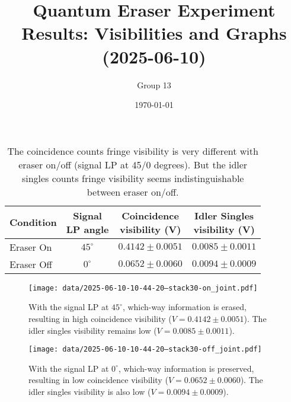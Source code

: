 \documentclass{article}
\title{Quantum Eraser Experiment Results: Visibilities and Graphs (2025-06-10)}
\author{Group 13} %
\date{\today}
\begin{document}
\pagestyle{empty} %

\begin{table}[h!]
\centering
\begin{tabular}{lccc}
\toprule
Condition & \makecell{Signal \\ LP angle} & \makecell{Coincidence \\ visibility (V)} & \makecell{Idler Singles \\ visibility (V)} \\
\midrule
Eraser On   & $45^\circ$ & $0.4142 \pm 0.0051$ & $0.0085 \pm 0.0011$ \\
Eraser Off  & $0^\circ$  & $0.0652 \pm 0.0060$ & $0.0094 \pm 0.0009$ \\
\bottomrule
\end{tabular}
\caption*{
  The coincidence counts fringe visibility is very different with eraser on/off (signal LP at 45/0 degrees).
  But the idler singles counts fringe visibility seems indistinguishable between eraser on/off.
}
\end{table}

\begin{figure}[h!]
\centering
\texttt{[image: data/2025-06-10-10-44-20--stack30-on\_joint.pdf]}
\caption*{
  With the signal LP at $45^\circ$, which-way information is erased, resulting in high coincidence visibility ($V=0.4142 \pm 0.0051$). The idler singles visibility remains low ($V=0.0085 \pm 0.0011$).
}
\end{figure}

\begin{figure}[h!]
\centering
\texttt{[image: data/2025-06-10-10-44-20--stack30-off\_joint.pdf]}
\caption*{
  With the signal LP at $0^\circ$, which-way information is preserved, resulting in low coincidence visibility ($V=0.0652 \pm 0.0060$). The idler singles visibility is also low ($V=0.0094 \pm 0.0009$).
}
\end{figure}
\end{document}
